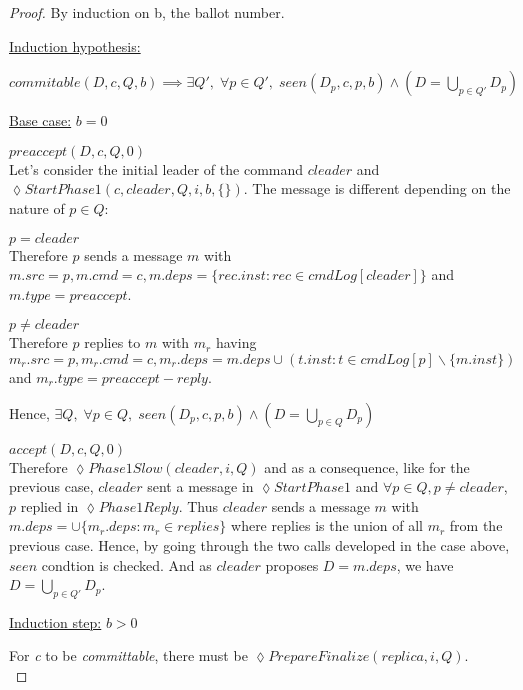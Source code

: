 \documentclass[a4paper]{article}
\theoremstyle{definition}
\theoremstyle{plain}
\begin{document}
\begin{proof}
By induction on b, the ballot number.

\begin{flushleft}
\underline{Induction hypothesis:}\\
\end{flushleft}
$ commitable(D,c,Q,b) \implies \exists Q', \; \forall p \in Q', \; seen(D_p,c,p,b) \wedge (D = \bigcup_{p \in Q'}{D_p})$\\


\begin{flushleft}
\underline{Base case:} $b = 0$
\end{flushleft}

\begin{case}
    \item $preaccept(D,c,Q,0)$ \\
    Let's consider the initial leader of the command $cleader$ and \\ $\lozenge StartPhase1(c,cleader,Q,i,b,\{\})$. The message is different depending on the nature of $p \in Q$:
    \begin{case}
        \item $p=cleader$\\
        Therefore $p$ sends a message $m$ with $m.src=p,m.cmd=c,m.deps= \{rec.inst : rec \in cmdLog[cleader]\}$ and $m.type = preaccept$.
        \item $p \neq cleader$\\
        Therefore $p$ replies to $m$ with $m_r$ having $m_r.src=p,m_r.cmd=c,m_r.deps= m.deps \cup ({t.inst : t \in cmdLog[p]} \backslash \{m.inst\})$ and $m_r.type = preaccept-reply$.
    \end{case}
    Hence, $\exists Q, \; \forall p \in Q, \; seen(D_p,c,p,b) \wedge (D = \bigcup_{p \in Q}{D_p})$
    
    \item $accept(D,c,Q,0)$ \\
    Therefore $\lozenge Phase1Slow(cleader,i,Q)$ and as a consequence, like for the previous case, $cleader$ sent a message in $\lozenge StartPhase1$ and $\forall p \in Q, p \neq cleader$, $p$ replied in $\lozenge Phase1Reply$. Thus $cleader$ sends a message $m$ with $m.deps = \cup \{m_r.deps : m_r \in replies\}$ where replies is the union of all $m_r$ from the previous case. Hence, by going through the two calls developed in the case above, $seen$ condtion is checked. And as $cleader$ proposes $D=m.deps$, we have $D = \bigcup_{p \in Q'}{D_p}$.
\end{case}
    \begin{flushleft}
    \underline{Induction step:} $b > 0$
    \end{flushleft}
    For \textit{c} to be \textit{committable}, there must be $\lozenge PrepareFinalize(replica, i, Q)$.\\
    

\end{proof}
\end{document}

